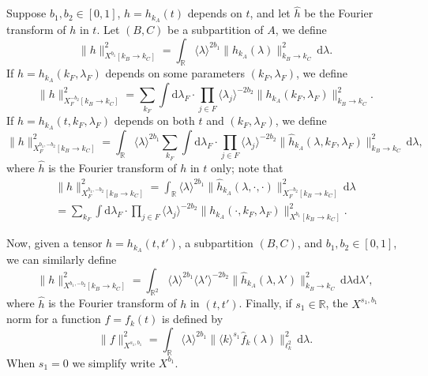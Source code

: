\documentclass[11 pt,reqno]{amsart}
\theoremstyle{definition}
\theoremstyle{remark}
\numberwithin{equation}{section}
\newcommand{\Rb}{\mathbb{R}}
\begin{document}
{Suppose $b_1,b_2\in[0,1]$, $h=h_{k_A}(t)$ depends on $t$, and let $\widehat{h}$ be the Fourier transform of $h$ in $t$. Let $(B,C)$ be a subpartition of $A$, we define
\begin{equation}\label{newnorm0}\|h\|_{X^{b_1}[k_B\to k_C]}^2=\int_\Rb\langle\lambda\rangle^{2b_1}\|\widehat{h}_{k_A}(\lambda)\|_{k_B\to k_C}^2\,\mathrm{d}\lambda.
\end{equation} If $h=h_{k_A}(k_F,\lambda_F)$ depends on some parameters $(k_F,\lambda_F)$, we define
 \begin{equation}\label{newnorm}\|h\|_{X_F^{-b_2}[k_B\to k_C]}^2=\sum_{k_F}\int\mathrm{d}\lambda_F\cdot\prod_{j\in F}\langle\lambda_j\rangle^{-2b_2}\|h_{k_A}(k_F,\lambda_F)\|_{k_B\to k_C}^2.
 \end{equation} If $h=h_{k_A}(t,k_F,\lambda_F)$ depends on both $t$ and $(k_F,\lambda_F)$, we define
  \begin{equation}\label{newnorm2}\|h\|_{X_F^{b_1,-b_2}[k_B\to k_C]}^2=\int_\Rb\langle\lambda\rangle^{2b_1}\sum_{k_F}\int\mathrm{d}\lambda_F\cdot\prod_{j\in F}\langle\lambda_j\rangle^{-2b_2}\|\widehat{h}_{k_A}(\lambda,k_F,\lambda_F)\|_{k_B\to k_C}^2\,\mathrm{d}\lambda,
 \end{equation} where $\widehat{h}$ is the Fourier transform of $h$ in $t$ only; note that
 \begin{multline}\label{relanorm}\|h\|_{X_F^{b_1,-b_2}[k_B\to k_C]}^2=\int_\Rb\langle \lambda\rangle^{2b_1}\|\widehat{h}_{k_A}(\lambda,\cdot,\cdot)\|_{X_F^{-b_2}[k_B\to k_C]}^2\,\mathrm{d}\lambda\\=\sum_{k_F}\int\mathrm{d}\lambda_F\cdot\prod_{j\in F}\langle\lambda_j\rangle^{-2b_2}\|h_{k_A}(\cdot,k_F,\lambda_F)\|_{X^{b_1}[k_B\to k_C]}^2.
 \end{multline}
 
Now, given a tensor $h=h_{k_A}(t,t')$, a subpartition $(B,C)$, and $b_1,b_2\in[0,1]$, we can similarly define
  \begin{equation}\label{newnorm3}\|h\|_{X^{b_1,-b_2}[k_B\to k_C]}^2=\int_{\Rb^2}\langle\lambda\rangle^{2b_1}\langle\lambda'\rangle^{-2b_2}\|\widehat{h}_{k_A}(\lambda,\lambda')\|_{k_B\to k_C}^2\,\mathrm{d}\lambda\mathrm{d}\lambda',
 \end{equation} where $\widehat{h}$ is the Fourier transform of $h$ in $(t,t')$. Finally, if $s_1\in\Rb$, the $X^{s_1,b_1}$ norm for a function $f=f_k(t)$ is defined by
 \begin{equation}\label{xbnorm}\|f\|_{X^{s_1,b_1}}^2=\int_\Rb\langle\lambda\rangle^{2b_1}\|\langle k\rangle^{s_1}\widehat{f}_k(\lambda)\|_{\ell_k^2}^2\,\mathrm{d}\lambda.
 \end{equation} When $s_1=0$ we simplify write $X^{b_1}$. 
}
\end{document}
